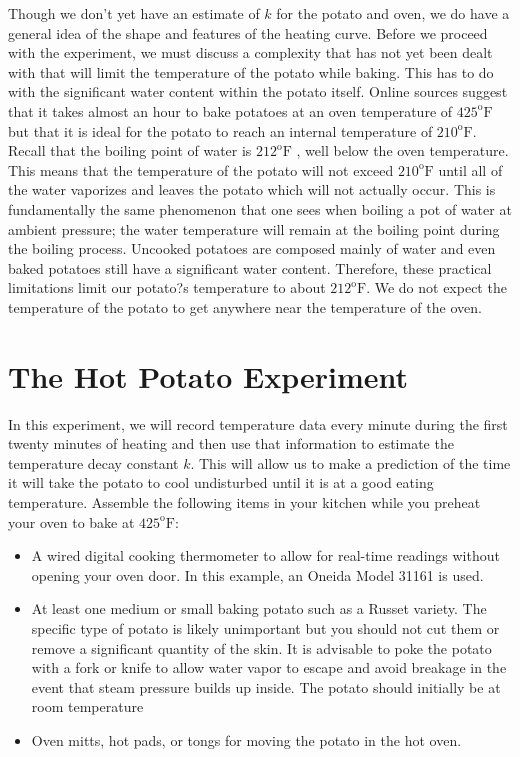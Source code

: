 \documentclass{ximera}
\begin{document}
Though we don't yet have an estimate of $k$ for the potato and oven, we do have a general idea of the shape and features of the heating curve.  Before we proceed with the experiment, we must discuss a complexity that has not yet been dealt with that will limit the temperature of the potato while baking.  This has to do with the significant water content within the potato itself.  Online sources suggest that it takes almost an hour to bake potatoes at an oven temperature of $425^{\text{o}}\text{F}$  but that it is ideal for the potato to reach an internal temperature of $210^{\text{o}}\text{F}$.  Recall that the boiling point of water is $212^{\text{o}}\text{F}$ , well below the oven temperature.  This means that the temperature of the potato will not exceed $210^{\text{o}}\text{F}$  until all of the water vaporizes and leaves the potato which will not actually occur. This is fundamentally the same phenomenon that one sees when boiling a pot of water at ambient pressure; the water temperature will remain at the boiling point during the boiling process.  Uncooked potatoes are composed mainly of water and even baked potatoes still have a significant water content.  Therefore, these practical limitations limit our potato?s temperature to about $212^{\text{o}}\text{F}$.  We do not expect the temperature of the potato to get anywhere near the temperature of the oven.


\section*{The Hot Potato Experiment}

In this experiment, we will record temperature data every minute during the first twenty minutes of heating and then use that information to estimate the temperature decay constant $k$.  This will allow us to make a prediction of the time it will take the potato to cool undisturbed until it is at a good eating temperature.
Assemble the following items in your kitchen while you preheat your oven to bake at $425^{\text{o}}\text{F}$:
\begin{itemize}
\item A wired digital cooking thermometer to allow for real-time readings without opening your oven door. In this example, an Oneida Model 31161 is used.
\item At least one medium or small baking potato such as a Russet variety. The specific type of potato is likely unimportant but you should not cut them or remove a significant quantity of the skin.  It is advisable to poke the potato with a fork or knife to allow water vapor to escape and avoid breakage in the event that steam pressure builds up inside.  The potato should initially be at room temperature
\item Oven mitts, hot pads, or tongs for moving the potato in the hot oven.
\end{itemize}
\end{document}
